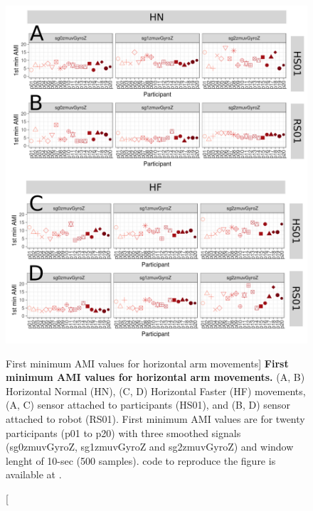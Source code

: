 \begin{figure}
\centering
\includegraphics[width=1.0\textwidth]{ami_aHw10}
	\caption
	[First minimum AMI values for horizontal arm movements]{
	{\bf First minimum AMI values for horizontal arm movements.}
		(A, B) Horizontal Normal (HN), (C, D) Horizontal Faster (HF) 
		movements,
		(A, C) sensor attached to participants (HS01), and
		(B, D) sensor attached to robot (RS01).
		First minimum AMI values are for twenty participants 
		(p01 to p20) with three smoothed signals (sg0zmuvGyroZ, 
		sg1zmuvGyroZ and sg2zmuvGyroZ) and  window lenght of 
		10-sec (500 samples).
	\R code to reproduce the figure is available at 
	.
        }
    \label{fig:amiH}
\end{figure}


